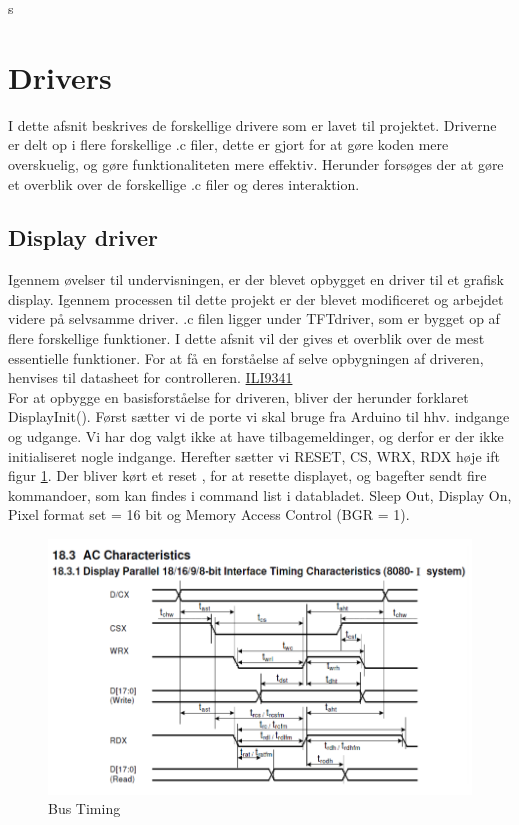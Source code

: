 s	%
\graphicspath{{Chapters/Drivers/}}


\section{Drivers}
I dette afsnit beskrives de forskellige drivere som er lavet til projektet. 
Driverne er delt op i flere forskellige .c filer, dette er gjort for at gøre koden mere overskuelig, og gøre funktionaliteten mere effektiv. Herunder forsøges der at gøre et overblik over de forskellige .c filer og deres interaktion.  


\subsection{Display driver}
Igennem øvelser til undervisningen, er der blevet opbygget en driver til et grafisk display. Igennem processen til dette projekt er der blevet modificeret og arbejdet videre på selvsamme driver. .c filen ligger under TFTdriver, som er bygget op af flere forskellige funktioner. I dette afsnit vil der gives et overblik over de mest essentielle funktioner. For at få en forståelse af selve opbygningen af driveren, henvises til datasheet for controlleren. 
\href{https://blackboard.au.dk/bbcswebdav/pid-1697983-dt-content-rid-3847230_1/courses/BB-Cou-UUVA-73302/BB-Cou-UUVA-65758_ImportedContent_20170106021228/BB-Cou-STADS-UUVA-52360_ImportedContent_20160107025559/LAB/Lab3a%20Graphic%20LCD%20Display/Files%20for%20LAB3a/ILI9341_v1.11.pdf}{ILI9341} \\
For at opbygge en basisforståelse for driveren, bliver der herunder forklaret DisplayInit(). Først sætter vi de porte vi skal bruge fra Arduino til hhv. indgange og udgange. Vi har dog valgt ikke at have tilbagemeldinger, og derfor er der ikke initialiseret nogle indgange. Herefter sætter vi RESET, CS, WRX, RDX høje ift figur \ref{fig:Bus_timing}. Der bliver kørt et reset , for at resette displayet, og bagefter sendt fire kommandoer, som kan findes i command list i databladet. Sleep Out, Display On, Pixel format set = 16 bit og Memory Access Control (BGR = 1).



\begin{figure}[H]
	\centering
	\includegraphics[width = 400 pt]{Img/Bus_timing.png}
	\caption{Bus Timing}
	\label{fig:Bus_timing}
\end{figure}

